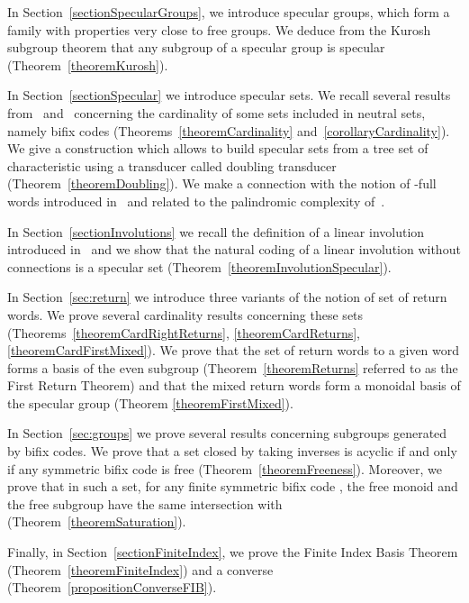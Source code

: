\documentclass[preprint,12pt]{elsarticle}
\numberwithin{theorem}{section}
\numberwithin{equation}{section}
\numberwithin{figure}{section}
\numberwithin{table}{section}
\begin{document}
In Section~\ref{sectionSpecularGroups}, we introduce specular groups, which form a family with properties very close to free groups.
We deduce from the Kurosh subgroup theorem that any subgroup of a specular group is specular (Theorem~\ref{theoremKurosh}).

In Section~\ref{sectionSpecular} we introduce specular sets.
We recall several results from~\cite{DolcePerrin2015} and~\cite{DolcePerrin2016} concerning the cardinality of some sets included in neutral sets, namely bifix codes (Theorems~\ref{theoremCardinality} and~\ref{corollaryCardinality}).
We give a construction which allows to build specular sets from a tree set of characteristic  using a transducer called doubling transducer (Theorem~\ref{theoremDoubling}).
We make a connection with the notion of -full words introduced in~\cite{PelantovaStarosta2014} and related to the palindromic complexity of~\cite{DroubayJustinPirillo2001}.

In Section~\ref{sectionInvolutions} we recall the definition of a linear involution introduced in~\cite{DanthonyNogueira1988} and we show that the natural coding of a linear involution without connections is a specular set (Theorem~\ref{theoremInvolutionSpecular}).

In Section~\ref{sec:return} we introduce three variants of the notion of set of return words.
We prove several cardinality results concerning these sets (Theorems~\ref{theoremCardRightReturns}, \ref{theoremCardReturns}, \ref{theoremCardFirstMixed}).
We prove that the set of return words to a given word forms a basis of the even subgroup (Theorem~\ref{theoremReturns} referred to as the First Return Theorem) and that the mixed return words form a monoidal basis of the specular group (Theorem \ref{theoremFirstMixed}).

In Section~\ref{sec:groups} we prove several results concerning subgroups generated by bifix codes.
We prove that a set closed by taking inverses is acyclic if and only if any symmetric bifix code is free (Theorem~\ref{theoremFreeness}).
Moreover, we prove that in such a set, for any finite symmetric bifix code , the free monoid  and the free subgroup  have the same intersection with  (Theorem~\ref{theoremSaturation}).

Finally, in Section~\ref{sectionFiniteIndex}, we prove the Finite Index Basis Theorem (Theorem~\ref{theoremFiniteIndex}) and a converse (Theorem~\ref{propositionConverseFIB}).
\end{document}
